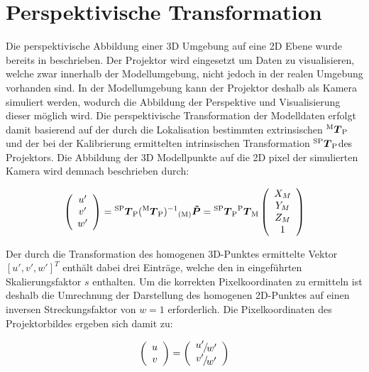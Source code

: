 \section{Perspektivische Transformation}
Die perspektivische Abbildung einer 3D Umgebung auf eine 2D Ebene wurde bereits in  beschrieben. Der Projektor wird eingesetzt um Daten zu visualisieren, welche zwar innerhalb der Modellumgebung, nicht jedoch in der realen Umgebung vorhanden sind. In der Modellumgebung kann der Projektor deshalb als Kamera simuliert werden, wodurch die Abbildung der Perspektive und Visualisierung dieser möglich wird. Die perspektivische Transformation der Modelldaten erfolgt damit basierend auf der durch die Lokalisation bestimmten extrinsischen ${^{\mathrm{M}}\mbox{\boldmath{$T$}}_{\mathrm{P}}}$ und der bei der Kalibrierung ermittelten intrinsischen Transformation ${^{\mathrm{SP}}\mbox{\boldmath{$T$}}_{\mathrm{P}}}$ des Projektors. Die Abbildung der 3D Modellpunkte auf die 2D pixel der simulierten Kamera wird demnach beschrieben durch:

\begin{equation}
\left(\begin{array}{c}
u'\\
v'\\
w'
\end{array}\right)
= {^{\mathrm{SP}}\mbox{\boldmath{$T$}}_{\mathrm{P}}}({^{\mathrm{M}}\mbox{\boldmath{$T$}}_{\mathrm{P}}})^{-1}{_{{\mathrm{(M)}}}}\mbox{\boldmath{$\tilde{P}$}} = {^{\mathrm{SP}}\mbox{\boldmath{$T$}}_{\mathrm{P}}}{^{\mathrm{P}}\mbox{\boldmath{$T$}}_{\mathrm{M}}} \left(\begin{array}{c}
X_M\\
Y_M\\
Z_M\\
1
\end{array} \right)
\label{eq.proj_trans}
\end{equation}

Der durch die Transformation des homogenen 3D-Punktes ermittelte Vektor $[u',v',w']^T$ enthält dabei drei Einträge, welche den in  eingeführten Skalierungsfaktor $s$ enthalten. Um die korrekten Pixelkoordinaten zu ermitteln ist deshalb die Umrechnung der Darstellung des homogenen 2D-Punktes auf einen inversen Streckungsfaktor von $w=1$ erforderlich. Die Pixelkoordinaten des Projektorbildes ergeben sich damit zu:

\begin{equation}
\left(\begin{array}{c}
u\\
v
\end{array}\right)
=
\left(\begin{array}{c}
\nicefrac{u'}{w'}\\
\nicefrac{v'}{w'}
\end{array}\right)
\end{equation}

